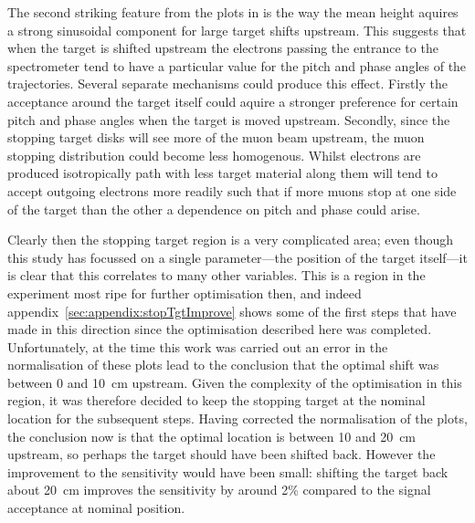 The second striking feature from the plots in  is the way the mean height aquires a strong sinusoidal component for large target shifts upstream.
This suggests that when the target is shifted upstream the electrons passing the entrance to the spectrometer tend to have a particular value for the pitch and phase angles of the trajectories.
Several separate mechanisms could produce this effect.
Firstly the acceptance around the target itself could aquire a stronger preference for certain pitch and phase angles when the target is moved upstream.
Secondly, since the stopping target disks will see more of the muon beam upstream, the muon stopping distribution could become less homogenous.  Whilst electrons are produced isotropically path with less target material along them will tend to accept outgoing electrons more readily such that if more muons stop at one side of the target than the other a dependence on pitch and phase could arise.

Clearly then the stopping target region is a very complicated area; even though this study has focussed on a single parameter---the position of the target itself---it is clear that this correlates to many other variables.
This is a region in the experiment most ripe for further optimisation then, and indeed appendix~\ref{sec:appendix:stopTgtImprove} shows some of the first steps that have made in this direction since the optimisation described here was completed.
Unfortunately, at the time this work was carried out an error in the normalisation of these plots lead to the conclusion that the optimal shift was between 0 and 10~cm upstream.
Given the complexity of the optimisation in this region, it was therefore decided to keep the stopping target at the nominal location for the subsequent steps.
Having corrected the normalisation of the plots, the conclusion now is that the optimal location is between 10 and 20~cm upstream, so perhaps the target should have been shifted back.
However the improvement to the sensitivity would have been small: shifting the target back about 20~cm improves the sensitivity by around 2\% compared to the signal acceptance at nominal position.

